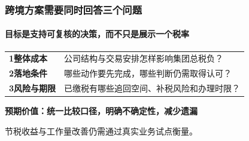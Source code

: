 \documentclass[english, sectionpage=false]{tumbeamer}
\newcommand{\subnote}[1]{{\small\color{TUMGrayDark} #1}}
\newcommand{\lead}[1]{{\large\bfseries\color{TUMBlue} #1}}
\begin{document}
\begin{frame}
  \frametitle{跨境方案需要同时回答三个问题}
  \framesubtitle{目标是支持可复核的决策，而不只是展示一个税率}
  \vspace{0.3em}
  \begin{tabular}{@{}p{}p{}@{}}
    \textcolor{TUMBlue}{\textbf{1}}\quad\textbf{整体成本} & 公司结构与交易安排怎样影响集团总税负？\\[0.9em]
    \textcolor{TUMBlue}{\textbf{2}}\quad\textbf{落地条件} & 哪些动作要先完成，哪些判断仍需取得认可？\\[0.9em]
    \textcolor{TUMBlue}{\textbf{3}}\quad\textbf{风险与期限} & 已缴税有哪些追回空间、补税风险和办理时限？
  \end{tabular}
  \par\vspace{1.0em}
  \lead{预期价值：统一比较口径，明确不确定性，减少遗漏}
  \par\vspace{0.35em}
  \subnote{节税收益与工作量改善仍需通过真实业务试点衡量。}
\end{frame}
\end{document}

